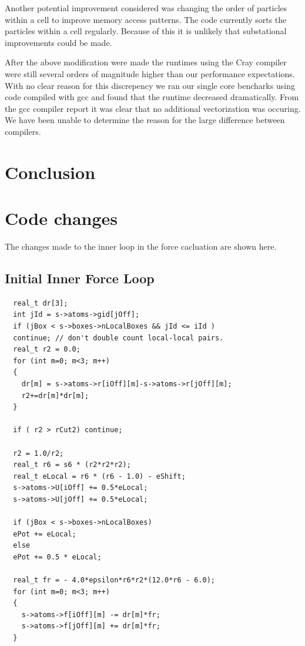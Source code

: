 \documentclass[12pt]{article}
\begin{document}
Another potential improvement considered was changing the order of
particles within a cell to improve memory access patterns. The code
currently sorts the particles within a cell regularly. Because of this
it is unlikely that substational improvements could be made.

After the above modification were made the runtimes using the Cray
compiler were still several orders of magnitude higher than our
performance expectations. With no clear reason for this discrepency we
ran our single core bencharks using code compiled with gcc and found
that the runtime decreased dramatically. From the gcc compiler report
it was clear that no additional vectorization was occuring. We have
been unable to determine the reason for the large difference between
compilers.

\section{Conclusion}



\appendix
\section{Code changes}
\label{apd:code-changes}
The changes made to the inner loop in the force cacluation are shown
here.
\subsection{Initial Inner Force Loop}
\begin{lstlisting}
  real_t dr[3];
  int jId = s->atoms->gid[jOff];  
  if (jBox < s->boxes->nLocalBoxes && jId <= iId )
  continue; // don't double count local-local pairs.
  real_t r2 = 0.0;
  for (int m=0; m<3; m++)
  {
    dr[m] = s->atoms->r[iOff][m]-s->atoms->r[jOff][m];
    r2+=dr[m]*dr[m];
  }

  if ( r2 > rCut2) continue;

  r2 = 1.0/r2;
  real_t r6 = s6 * (r2*r2*r2);
  real_t eLocal = r6 * (r6 - 1.0) - eShift;
  s->atoms->U[iOff] += 0.5*eLocal;
  s->atoms->U[jOff] += 0.5*eLocal;

  if (jBox < s->boxes->nLocalBoxes)
  ePot += eLocal;
  else
  ePot += 0.5 * eLocal;

  real_t fr = - 4.0*epsilon*r6*r2*(12.0*r6 - 6.0);
  for (int m=0; m<3; m++)
  {
    s->atoms->f[iOff][m] -= dr[m]*fr;
    s->atoms->f[jOff][m] += dr[m]*fr;
  }
\end{lstlisting}
\end{document}
